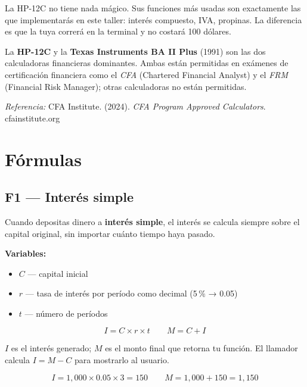 \documentclass[12pt, oneside]{article}
\begin{document}
La HP-12C no tiene nada mágico.  Sus funciones más usadas son exactamente
las que implementarás en este taller: interés compuesto, IVA, propinas.
La diferencia es que la tuya correrá en la terminal y no costará 100 dólares.

\begin{tecnico}
  La \textbf{HP-12C} y la \textbf{Texas Instruments BA II Plus} (1991)
  son las dos calculadoras financieras dominantes.  Ambas están permitidas
  en exámenes de certificación financiera como el \textit{CFA} (Chartered
  Financial Analyst) y el \textit{FRM} (Financial Risk Manager); otras
  calculadoras no están permitidas.
  \par\smallskip
  \textit{Referencia:} CFA Institute. (2024). \textit{CFA Program
  Approved Calculators}. cfainstitute.org
\end{tecnico}

\section{Fórmulas}

\subsection{F1 — Interés simple}

Cuando depositas dinero a \textbf{interés simple}, el interés se calcula
siempre sobre el capital original, sin importar cuánto tiempo haya pasado.

\textbf{Variables:}
\begin{itemize}
  \item $C$ — capital inicial
  \item $r$ — tasa de interés por período como decimal (5\,\% → 0.05)
  \item $t$ — número de períodos
\end{itemize}

\[
  I = C \times r \times t
  \qquad
  M = C + I
\]

$I$ es el interés generado; $M$ es el monto final que retorna tu función.
El llamador calcula $I = M - C$ para mostrarlo al usuario.

\begin{ejemplo}
  \[
    I = 1{,}000 \times 0.05 \times 3 = 150
    \qquad
    M = 1{,}000 + 150 = 1{,}150
  \]
\end{ejemplo}
\end{document}
